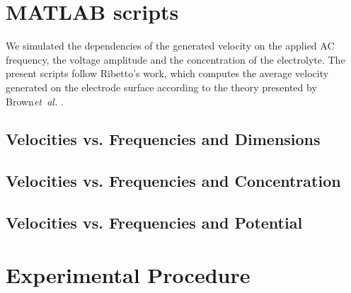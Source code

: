 \documentclass[journal,svgnames,twocolumn,x11names]{IEEEtran}
\begin{document}
\section{MATLAB scripts}
We simulated the dependencies of the generated velocity on the applied AC frequency, the voltage amplitude and the concentration of the electrolyte. The present scripts follow Ribetto's work\cite{Ribetto2012}, which computes the average velocity generated on the electrode surface according to the theory presented by Brown\textit{et~al.} \cite{Brown2000}.

\subsection{Velocities vs. Frequencies and Dimensions}




\subsection{Velocities vs. Frequencies and Concentration}


\subsection{Velocities vs. Frequencies and Potential}


\section{Experimental Procedure}
\end{document}
